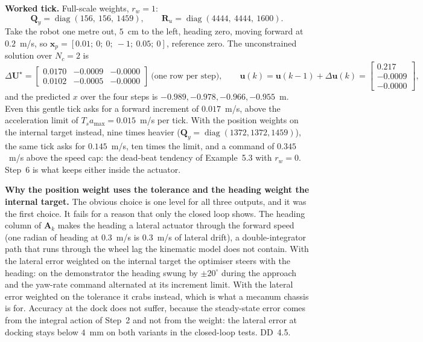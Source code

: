\documentclass[11pt,a4paper]{article}
\newcommand{\vect}[1]{\bm{#1}}
\newcommand{\mat}[1]{\bm{#1}}
\newcommand{\diag}{\operatorname{diag}}
\newcommand{\dU}{\Delta\vect{U}}
\newcommand{\du}{\Delta\vect{u}}
\newcommand{\Ts}{T_s}
\newcommand{\Nc}{N_c}
\begin{document}
\textbf{Worked tick.} Full-scale weights, $r_w = 1$:
\begin{equation}
\mat Q_y = \diag(156,\ 156,\ 1459),\qquad \mat R_u = \diag(4444,\ 4444,\ 1600).
\end{equation}
Take the robot one metre out, $5$~cm to the left, heading zero, moving forward at $0.2$~m/s, so $\vect x_p = [0.01;\ 0;\ 0;\ -1;\ 0.05;\ 0]$, reference zero. The unconstrained solution over $\Nc = 2$ is
\begin{equation}
\dU^\star = \begin{bmatrix}0.0170 & -0.0009 & -0.0000\\ 0.0102 & -0.0005 & -0.0000\end{bmatrix}\ \text{(one row per step)},
\qquad
\vect u(k) = \vect u(k-1) + \du(k) = \begin{bmatrix}0.217\\ -0.0009\\ -0.0000\end{bmatrix},
\end{equation}
and the predicted $x$ over the four steps is $-0.989, -0.978, -0.966, -0.955$~m. Even this gentle tick asks for a forward increment of $0.017$~m/s, above the acceleration limit of $\Ts a_{\max} = 0.015$~m/s per tick. With the position weights on the internal target instead, nine times heavier ($\mat Q_y = \diag(1372, 1372, 1459)$), the same tick asks for $0.145$~m/s, ten times the limit, and a command of $0.345$~m/s above the speed cap: the dead-beat tendency of Example~5.3 with $r_w = 0$. Step~6 is what keeps either inside the actuator.

\textbf{Why the position weight uses the tolerance and the heading weight the internal target.} The obvious choice is one level for all three outputs, and it was the first choice. It fails for a reason that only the closed loop shows. The heading column of $\mat A_k$ makes the heading a lateral actuator through the forward speed (one radian of heading at $0.3$~m/s is $0.3$~m/s of lateral drift), a double-integrator path that runs through the wheel lag the kinematic model does not contain. With the lateral error weighted on the internal target the optimiser steers with the heading: on the demonstrator the heading swung by $\pm 20^\circ$ during the approach and the yaw-rate command alternated at its increment limit. With the lateral error weighted on the tolerance it crabs instead, which is what a mecanum chassis is for. Accuracy at the dock does not suffer, because the steady-state error comes from the integral action of Step~2 and not from the weight: the lateral error at docking stays below $4$~mm on both variants in the closed-loop tests. DD~4.5.
\end{document}

